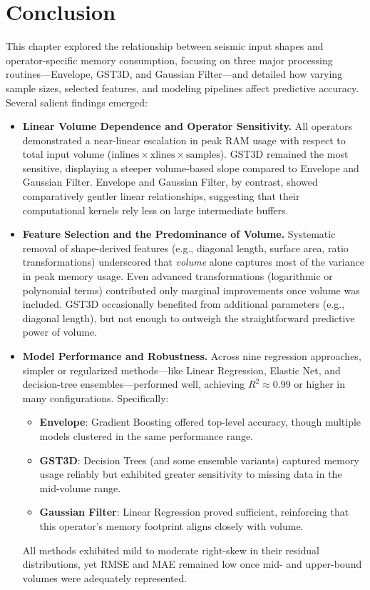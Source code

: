 \section{Conclusion}
\label{sec:pmc-conclusion}

This chapter explored the relationship between seismic input shapes and operator-specific memory consumption, focusing on three major processing routines—Envelope, \ac{GST3D}, and Gaussian Filter—and detailed how varying sample sizes, selected features, and modeling pipelines affect predictive accuracy.
Several salient findings emerged:

\begin{itemize}
    \item \textbf{Linear Volume Dependence and Operator Sensitivity.}
    All operators demonstrated a near-linear escalation in peak \ac{RAM} usage with respect to total input volume (\( \text{inlines} \times \text{xlines} \times \text{samples} \)).
    \ac{GST3D} remained the most sensitive, displaying a steeper volume-based slope compared to Envelope and Gaussian Filter.
    Envelope and Gaussian Filter, by contrast, showed comparatively gentler linear relationships, suggesting that their computational kernels rely less on large intermediate buffers.

    \item \textbf{Feature Selection and the Predominance of Volume.}
    Systematic removal of shape-derived features (e.g., diagonal length, surface area, ratio transformations) underscored that \emph{volume} alone captures most of the variance in peak memory usage.
    Even advanced transformations (logarithmic or polynomial terms) contributed only marginal improvements once volume was included.
    \ac{GST3D} occasionally benefited from additional parameters (e.g., diagonal length), but not enough to outweigh the straightforward predictive power of volume.

    \item \textbf{Model Performance and Robustness.}
    Across nine regression approaches, simpler or regularized methods—like Linear Regression, Elastic Net, and decision-tree ensembles—performed well, achieving \(R^2 \approx 0.99\) or higher in many configurations.
    Specifically:
    \begin{itemize}
        \item \textbf{Envelope}: Gradient Boosting offered top-level accuracy, though multiple models clustered in the same performance range.
        \item \textbf{\ac{GST3D}}: Decision Trees (and some ensemble variants) captured memory usage reliably but exhibited greater sensitivity to missing data in the mid-volume range.
        \item \textbf{Gaussian Filter}: Linear Regression proved sufficient, reinforcing that this operator’s memory footprint aligns closely with volume.
    \end{itemize}
    All methods exhibited mild to moderate right-skew in their residual distributions, yet \ac{RMSE} and \ac{MAE} remained low once mid- and upper-bound volumes were adequately represented.


\end{itemize}
